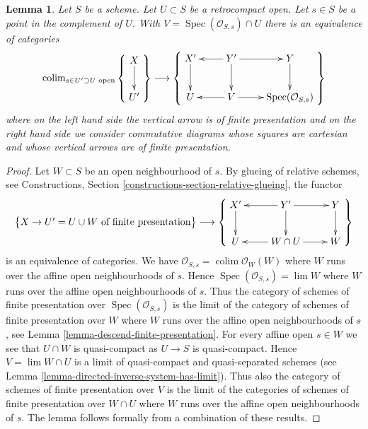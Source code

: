 \documentclass{stacks-project}
\theoremstyle{plain}
\newtheorem{lemma}[subsection]{Lemma}
\theoremstyle{definition}
\theoremstyle{remark}
\numberwithin{equation}{subsection}
\def\lim{\mathop{\mathrm{lim}}\nolimits}
\def\colim{\mathop{\mathrm{colim}}\nolimits}
\def\Spec{\mathop{\mathrm{Spec}}}
\begin{document}
\begin{lemma}
\label{lemma-glueing-near-point}
Let $S$ be a scheme. Let $U \subset S$ be a retrocompact open.
Let $s \in S$ be a point in the complement of $U$. With
$V = \Spec(\mathcal{O}_{S, s}) \cap U$ there is
an equivalence of categories
$$
\colim_{s \in U' \supset U\text{ open}}
\left\{
\vcenter{
\xymatrix{
X \ar[d] \\
U'
}
}
\right\}
\longrightarrow
\left\{
\vcenter{
\xymatrix{
X' \ar[d] & Y' \ar[d] \ar[l] \ar[r] & Y \ar[d] \\
U & V \ar[l] \ar[r] & \Spec(\mathcal{O}_{S, s})
}
}
\right\}
$$
where on the left hand side the vertical arrow is of finite
presentation and on the right hand side we consider commutative diagrams
whose squares are cartesian and whose vertical arrows are
of finite presentation.
\end{lemma}

\begin{proof}
Let $W \subset S$ be an open neighbourhood of $s$. By
glueing of relative schemes, see
Constructions, Section \ref{constructions-section-relative-glueing},
the functor
$$
\left\{
\begin{matrix}
X \to U' = U \cup W \text{ of finite presentation}
\end{matrix}
\right\}
\longrightarrow
\left\{
\vcenter{
\xymatrix{
X' \ar[d] & Y' \ar[d] \ar[l] \ar[r] & Y \ar[d] \\
U & W \cap U \ar[l] \ar[r] & W
}
}
\right\}
$$
is an equivalence of categories. We have
$\mathcal{O}_{S, s} = \colim \mathcal{O}_W(W)$ where
$W$ runs over the affine open neighbourhoods of $s$.
Hence $\Spec(\mathcal{O}_{S, s}) = \lim W$ where $W$
runs over the affine open neighbourhoods of $s$.
Thus the category of schemes of finite presentation
over $\Spec(\mathcal{O}_{S, s})$ is the limit of the
category of schemes of finite presentation over
$W$ where $W$ runs over the affine open neighbourhoods
of $s$, see
Lemma \ref{lemma-descend-finite-presentation}.
For every affine open $s \in W$ we see that $U \cap W$
is quasi-compact as $U \to S$ is quasi-compact.
Hence $V = \lim W \cap U$ is a limit of
quasi-compact and quasi-separated schemes (see
Lemma \ref{lemma-directed-inverse-system-has-limit}).
Thus also the category of schemes of finite presentation
over $V$ is the limit of the
categories of schemes of finite presentation over
$W \cap U$ where $W$ runs over the affine open neighbourhoods
of $s$. The lemma follows formally from a combination
of these results.
\end{proof}
\end{document}
